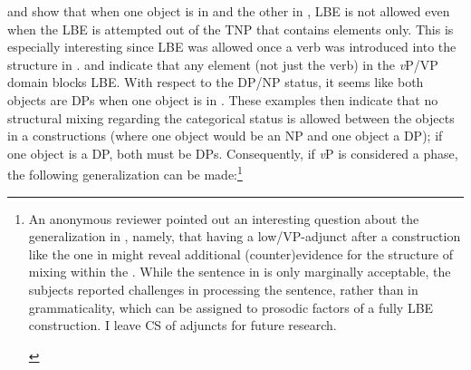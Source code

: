 \documentclass[output=paper,hidelinks,newtxmath,]{langscibook}
\begin{document}
\noindent {} and  show that when one object is in  and the other in , LBE is not allowed even when the LBE is attempted out of the TNP that contains  elements only. This is especially interesting since LBE was allowed once a  verb was introduced into the structure in .  and  indicate that any  element (not just the verb) in the \textit{v}P/VP domain blocks LBE. With respect to the DP/NP status, it seems like both objects are DPs when one object is in . These examples then indicate that no structural mixing regarding the categorical status is allowed between the objects in a  constructions (where one object would be an NP and one object a DP); if one object is a DP, both must be DPs. Consequently, if \textit{v}P is considered a phase, the following generalization can be made:\footnote{\label{15:fn12}An anonymous reviewer pointed out an interesting question about the generalization in , namely, that having a  low/VP-adjunct after a   construction like the one in  might reveal additional (counter)evidence for the structure of mixing within the . While the sentence in  is only marginally acceptable, the subjects reported challenges in processing the sentence, rather than in grammaticality, which can be assigned to prosodic factors of a fully  LBE construction. I leave CS of adjuncts for future research.

\ea\label{15:fn12ex}
\z\z

}
\end{document}
